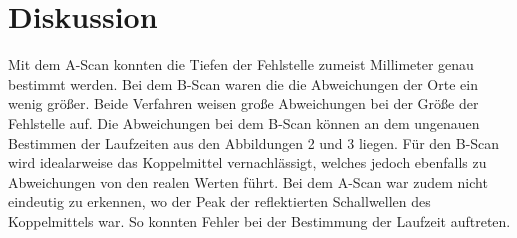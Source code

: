 \section{Diskussion}
\label{sec:Diskussion}

Mit dem A-Scan konnten die Tiefen der Fehlstelle zumeist Millimeter genau bestimmt werden. Bei dem
B-Scan waren die die Abweichungen der Orte ein wenig größer. Beide Verfahren weisen große Abweichungen bei der
Größe der Fehlstelle auf. Die Abweichungen bei dem B-Scan können an dem ungenauen Bestimmen der Laufzeiten aus
den Abbildungen 2 und 3 liegen. Für den B-Scan wird idealarweise das Koppelmittel vernachlässigt, welches jedoch
ebenfalls zu Abweichungen von den realen Werten führt.
Bei dem A-Scan war zudem nicht eindeutig zu erkennen, wo der Peak der reflektierten Schallwellen des Koppelmittels war. So konnten
Fehler bei der Bestimmung der Laufzeit auftreten.
